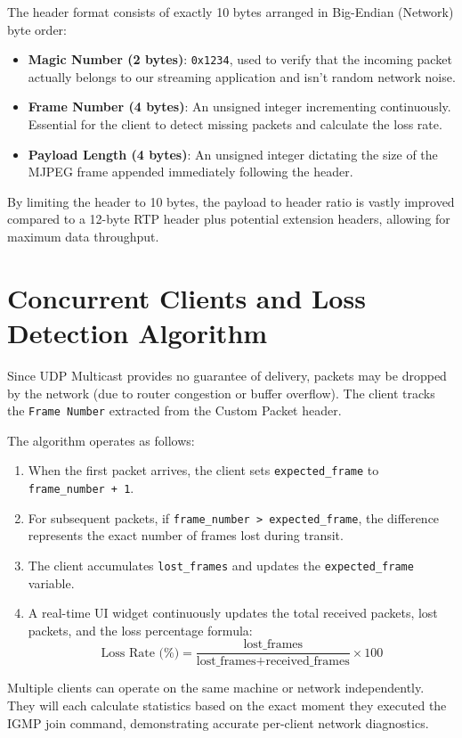 \documentclass[12pt,a4paper]{report}
\begin{document}
The header format consists of exactly 10 bytes arranged in Big-Endian (Network) byte order:
\begin{itemize}
    \item \textbf{Magic Number (2 bytes)}: \texttt{0x1234}, used to verify that the incoming packet actually belongs to our streaming application and isn't random network noise.
    \item \textbf{Frame Number (4 bytes)}: An unsigned integer incrementing continuously. Essential for the client to detect missing packets and calculate the loss rate.
    \item \textbf{Payload Length (4 bytes)}: An unsigned integer dictating the size of the MJPEG frame appended immediately following the header.
\end{itemize}

By limiting the header to 10 bytes, the payload to header ratio is vastly improved compared to a 12-byte RTP header plus potential extension headers, allowing for maximum data throughput.

\section{Concurrent Clients and Loss Detection Algorithm}
Since UDP Multicast provides no guarantee of delivery, packets may be dropped by the network (due to router congestion or buffer overflow). The client tracks the \texttt{Frame Number} extracted from the Custom Packet header. 

The algorithm operates as follows:
\begin{enumerate}
    \item When the first packet arrives, the client sets \texttt{expected\_frame} to \texttt{frame\_number + 1}.
    \item For subsequent packets, if \texttt{frame\_number > expected\_frame}, the difference represents the exact number of frames lost during transit.
    \item The client accumulates \texttt{lost\_frames} and updates the \texttt{expected\_frame} variable.
    \item A real-time UI widget continuously updates the total received packets, lost packets, and the loss percentage formula: 
    $$ \text{Loss Rate (\%)} = \frac{\text{lost\_frames}}{\text{lost\_frames} + \text{received\_frames}} \times 100 $$
\end{enumerate}

Multiple clients can operate on the same machine or network independently. They will each calculate statistics based on the exact moment they executed the IGMP join command, demonstrating accurate per-client network diagnostics.
\end{document}

